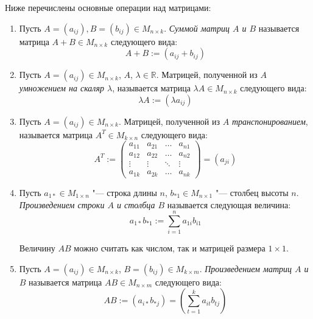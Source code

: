    \begin{definition}
    	Ниже перечислены основные операции над матрицами:
    	
    	\begin{enumerate}
    		\item Пусть $A = (a_{ij}), B = (b_{ij}) \in M_{n \times k}$. \textit{Суммой матриц $A$ и $B$} называется матрица $A+B \in M_{n \times k}$ следующего вида:
    		\[A + B := (a_{ij} + b_{ij})\]
    		
    		\item Пусть $A = (a_{ij}) \in M_{n \times k}$, $A$, $\lambda \in \mathbb{R}$.  Матрицей, полученной из $A$ \textit{умножением на скаляр $\lambda$}, называется матрица $\lambda A \in M_{n \times k}$ следующего вида:
    		\[\lambda A := (\lambda a_{ij})\]
    		
    		\item Пусть $A = (a_{ij}) \in M_{n \times k}$. Матрицей, полученной из $A$ \textit{транспонированием}, называется матрица $A^T \in M_{k \times n}$ следующего вида:
    		\[A^T := 
    		\begin{pmatrix}
    		a_{11} & a_{21} & \dots & a_{n1} \\
    		a_{12} & a_{22} & \dots & a_{n2} \\
    		\vdots & \vdots & \ddots & \vdots \\
    		a_{1k} & a_{2k} & \dots & a_{nk}
    		\end{pmatrix}
    		= (a_{ji})\]
    		
    		\item Пусть $a_{1*} \in M_{1 \times n}$ "--- строка длины $n$, $b_{*1} \in M_{n \times 1}$ "--- столбец высоты $n$. \textit{Произведением строки $A$ и столбца $B$} называется следующая величина:
    		\[a_{1*}b_{*1} := \sum_{i = 1}^{n} a_{1i}b_{i1}\]
    		
    		Величину $AB$ можно считать как числом, так и матрицей размера $1 \times 1$.
    		
    		\item Пусть $A = (a_{ij}) \in M_{n \times k}$, $B = (b_{ij}) \in M_{k \times m}$. \textit{Произведением матриц $A$ и $B$} называется матрица $AB \in M_{n \times m}$ следующего вида:
    		\[AB := (a_{i*}b_{*j}) = \left(\sum_{t = 1}^{k} a_{it}b_{tj}\right)\]
    	\end{enumerate}
    \end{definition}
    

